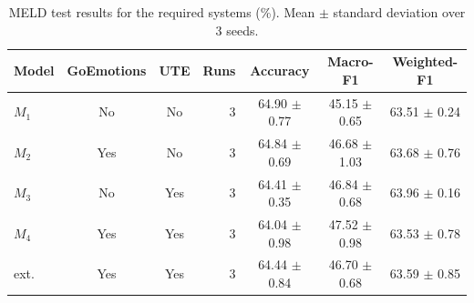 \begin{table}[t]
\centering
\caption{MELD test results for the required systems (\%). Mean $\pm$ standard deviation over 3 seeds.}
\label{tab:main}
\begin{tabular}{lccrccc}
\toprule
Model & GoEmotions & UTE & Runs & Accuracy & Macro-F1 & Weighted-F1 \\
\midrule
$M_1$ & No & No & 3 & 64.90 $\pm$ 0.77 & 45.15 $\pm$ 0.65 & 63.51 $\pm$ 0.24 \\
$M_2$ & Yes & No & 3 & 64.84 $\pm$ 0.69 & 46.68 $\pm$ 1.03 & 63.68 $\pm$ 0.76 \\
$M_3$ & No & Yes & 3 & 64.41 $\pm$ 0.35 & 46.84 $\pm$ 0.68 & 63.96 $\pm$ 0.16 \\
$M_4$ & Yes & Yes & 3 & 64.04 $\pm$ 0.98 & 47.52 $\pm$ 0.98 & 63.53 $\pm$ 0.78 \\
ext. & Yes & Yes & 3 & 64.44 $\pm$ 0.84 & 46.70 $\pm$ 0.68 & 63.59 $\pm$ 0.85 \\
\bottomrule
\end{tabular}
\end{table}
